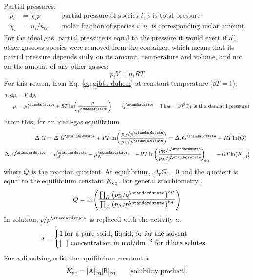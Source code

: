 \documentclass[11pt,a4paper,twoside]{article}
\numberwithin{equation}{section}
\newcommand{\eqn}[1]{Eq.~\eqref{#1}}
\newcommand{\DrG}{\ensuremath{\Delta_{\mathrm{r}}G}}
\newcommand{\std}{^{\standardstate}}
\begin{document}
Partial pressures:
\begin{align}
    p_i & = \chi_{i} p & &
        \text{partial pressure of species $i$; $p$ is total pressure} \\
    \chi_i & = n_i/n_{\mathrm{tot}} & &
        \text{molar fraction of species $i$; $n_i$ is corresponding molar amount}
\end{align}
For the ideal gas, partial pressure is equal to the pressure it would exert if all other gaseous species were removed from the container, which means that its partial pressure depends
\textbf{only} on its amount, temperature and volume, and not on the amount of any other gasses:
\begin{equation}
    p_i V = n_i R T
\end{equation}
For this reason, from \eqn{eq:gibbs-duhem} at constant temperature ($\dd{T} = 0$),
\begin{subequations}
    \begin{align}
        n_{i} \dd{\mu_i} & = V \dd{p_{i}} \\
        \mu_i & = \mu_i\std + R T \ln(\frac{p}{p\std}) \qquad
        (p\std = \SI{1}{bar} = \SI{e5}{Pa} \text{ is the standard pressure})
    \end{align}        
\end{subequations}
From this, for an ideal-gas equilibrium 
\begin{align}
    \DrG & = \DrG\std + R T \ln(\frac{p_{\rm B}/p\std}{p_{\rm A}/p\std}\!)
    = \DrG\std + R T \ln(Q)\\
    \DrG\std & = \mu_{\rm B}\std - \mu_{\rm A}\std = -R T \ln(\frac{p_{\rm B}/p\std}{p_{\rm A}/p\std}\!)_{\! \rm eq} = - R T \ln(K_{\rm eq})
    \label{eq:gibbs-keq}
\end{align}
where $Q$ is the reaction quotient. At equilibrium, $\DrG = 0$ and the quotient is equal to the equilibrium constant $K_{\rm eq}$. For 
general stoichiometry ,
\begin{equation}
    Q = \ln(
        \frac{\prod_{B} \qty(p_{\rm B} / p\std)^{\nu_B}}{
              \prod_{A} \qty(p_{\rm A} / p\std)^{\nu_A}
        }
    )
\end{equation}
In solution, $p/p\std$ is replaced with the activity $a$.
\begin{equation}
    a = \begin{cases}
        1 \text{ for a pure solid, liquid, or for the solvent} \\
        [\mkern14mu ]\text{ concentration in \SI{}{mol/dm^{-3}} for dilute solutes}
    \end{cases}
\end{equation}
For a dissolving solid  the equilibrium constant is
\begin{equation}
    K_{\rm sp} = [{\rm A}]_{\rm eq}[{\rm B}]_{\rm eq}
    \qquad \text{[solubility product]}.
\end{equation}
\end{document}
